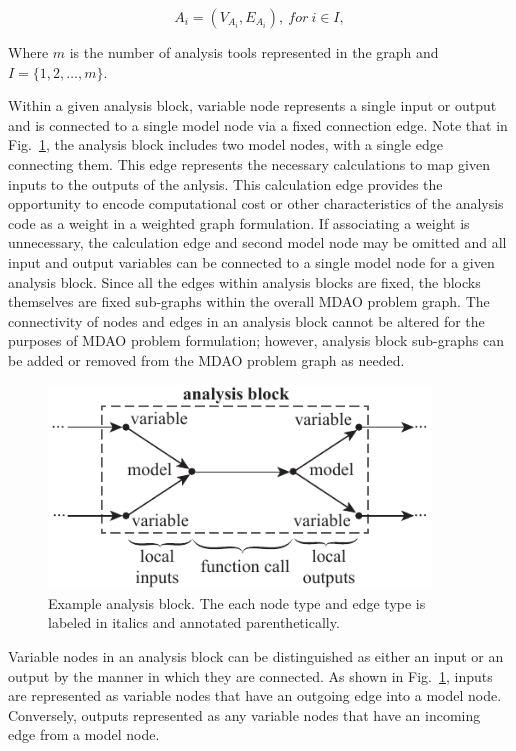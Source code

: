 \begin{equation}
  A_i=(V_{A_i},E_{A_i}),\ for\ i\in I, 
\end{equation}

Where $m$ is the number of analysis tools represented in the graph 
and $I=\{1,2,\ldots,m\}$.


Within a given analysis block, variable node represents a single input or 
output and is connected to a single model node via a fixed connection edge. Note that 
in Fig.~\ref{f:analysis block}, the analysis block includes two model nodes, 
with a single edge connecting them. This edge represents the necessary 
calculations to map given inputs to the outputs of the anlysis. This calculation edge provides the opportunity 
to encode computational cost or other characteristics of the analysis code as 
a weight in a weighted graph formulation. If associating a weight is 
unnecessary, the calculation edge and second model node may be omitted and all input and output 
variables can be connected to a single model node for a given analysis block. 
Since all the edges within analysis blocks are fixed, the blocks themselves are 
fixed sub-graphs within the overall MDAO problem graph. The connectivity of 
nodes and edges in an analysis block cannot be altered for the purposes of MDAO 
problem formulation; however, analysis block sub-graphs can be added or removed 
from the MDAO problem graph as needed.

\begin{figure}[htb!]
    \begin{center}
    \includegraphics[width=4in]{images/analysis_block}
    \end{center}
    \vspace{-10pt}
\caption{Example analysis block. The each node type and edge type is labeled in italics and annotated parenthetically.}
\label{f:analysis block}
\end{figure}

Variable nodes in an analysis block can be distinguished as either an input or 
an output by the manner in which they are connected. As shown in Fig.~\ref{f:analysis block}, 
inputs are represented as variable nodes that have an outgoing edge into a model 
node. Conversely, outputs represented as any variable nodes that have an incoming 
edge from a model node. 

